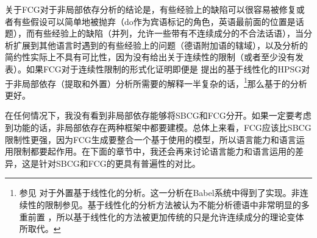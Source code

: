 关于FCG对于非局部依存分析的结论是，有些经验上的缺陷可以很容易被修复或者有些假设可以简单地被抛弃（do作为宾语标记的角色，英语最前面的位置是话题），而有些经验上的缺陷（并列，允许一些带有不连续成分的不合法话语），当分析扩展到其他语言时遇到的有些经验上的问题（德语附加语的辖域），以及分析的简约性实际上不具有可比性，因为没有给出关于连续性的限制（或者至少没有发表）。如果FCG对于连续性限制的形式化证明即便是 \citet{Reape2000a}提出的基于线性化的HPSG对于非局部依存（提取和外置）分析所需要的解释一半复杂的话，\footnote{%
  参见 对于外置基于线性化的分析。这一分析在Babel系统中得到了实现\citep{Babel}。非连续性的限制参见\citet{Mueller99g}。基于线性化的分析方法被认为不能分析德语中非常明显的多重前置\citep{Mueller2005d,MuellerGS} ，所以基于线性化的方法被更加传统的只是允许连续成分的理论变体所取代。
}那么基于\slaschc 的分析更好。

在任何情况下，我没有看到非局部依存能够将SBCG和FCG分开。如果一定要考虑到功能的话，非局部依存在两种框架中都要建模。总体上来看，FCG应该比SBCG限制性更强，因为FCG生成要整合一个基于使用的模型，所以语言能力和语言运用限制都要起作用。在下面的章节中，我还会再来讨论语言能力和语言运用的差异，这是针对SBCG和FCG的更具有普遍性的对比。

